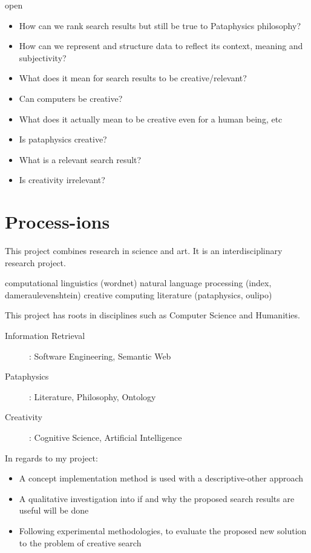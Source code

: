 open
\begin{itemize}
  \item How can we rank search results but still be true to Pataphysics philosophy?
  \item How can we represent and structure data to reflect its context, meaning and subjectivity?
  \item What does it mean for search results to be creative/relevant?
  \item Can computers be creative?
  \item What does it actually mean to be creative even for a human being, etc
  \item Is pataphysics creative?
  \item What is a relevant search result?
  \item Is creativity irrelevant?
\end{itemize}


\section{Process-ions}

This project combines research in science and art. It is an interdisciplinary research project.

computational linguistics (wordnet)
natural language processing (index, dameraulevenshtein)
creative computing
literature (pataphysics, oulipo)



This project has roots in disciplines such as Computer Science and Humanities.
\begin{description}
  \item [Information Retrieval]: Software Engineering, Semantic Web
  \item [Pataphysics]: Literature, Philosophy, Ontology
  \item [Creativity]: Cognitive Science, Artificial Intelligence
\end{description}

In regards to my project:
\begin{itemize}
  \item A concept implementation method is used with a descriptive-other approach
  \item A qualitative investigation into if and why the proposed search results are useful will be done
  \item Following experimental methodologies, to evaluate the proposed new solution to the problem of creative search
\end{itemize}

